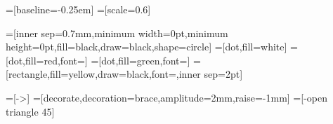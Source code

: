 =[baseline=-0.25em]
=[scale=0.6]

=[inner sep=0.7mm,minimum width=0pt,minimum height=0pt,fill=black,draw=black,shape=circle]
=[dot,fill=white]
=[dot,fill=red,font=\footnotesize\color{white}]
=[dot,fill=green,font=\footnotesize]
=[rectangle,fill=yellow,draw=black,font=\footnotesize,inner sep=2pt]

=[->]
=[decorate,decoration={brace,amplitude=2mm,raise=-1mm}]
=[-open triangle 45]
